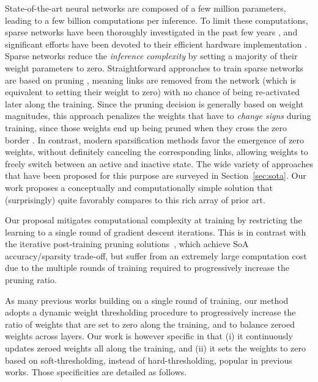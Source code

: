 \documentclass[10pt,twocolumn,letterpaper]{article}
\begin{document}
State-of-the-art neural networks are composed of a few million parameters, leading to a few billion computations per inference. To limit these computations, sparse networks have been thoroughly investigated in the past few years \cite{Zhu2018,Frankle2019,Liu2019,Zhou2019a,Lee2019,Wortsman2019,Evci2020,Frankle2020,Renda2020,Li2020,Zhou2021,Liu2021}, and significant efforts have been devoted to their efficient hardware implementation \cite{Gray2017,Mishra2021}. Sparse networks reduce the \emph{inference complexity} by setting a majority of their weight parameters to zero. Straightforward approaches to train sparse networks are based on pruning \cite{Zhu2018,Han2015,Frankle2019}, meaning links are removed from the network (which is equivalent to setting their weight to zero)  with no chance of being re-activated later along the training. 
Since the pruning decision is generally based on weight magnitudes, this approach penalizes the weights that have to \emph{change signs} during training, since those weights end up being pruned when they cross the zero border \cite{Sanh2020}. 
In contrast, modern sparsification methods favor the emergence of zero weights, without definitely canceling the corresponding links,
allowing weights to freely switch between an active and inactive state. 
The wide variety of approaches that have been proposed for this purpose are surveyed in Section~\ref{sec:sota}. Our work proposes a conceptually and computationally simple solution that (surprisingly) quite favorably compares to this rich array of prior art. 

Our proposal mitigates computational complexity at training by restricting the learning to a single round of gradient descent iterations. This is in contrast with the iterative post-training pruning solutions~\cite{Frankle2020,Renda2020}, which achieve SoA accuracy/sparsity trade-off, but suffer from an extremely large computation cost due to the multiple rounds of training required to progressively increase the pruning ratio.

As many previous works building on a single round of training, our method adopts a dynamic weight thresholding procedure to progressively increase the ratio of weights that are set to zero along the training, and to balance zeroed weights across layers. 
Our work is however specific in that (i) it continuously updates zeroed weights all along the training, and (ii) it sets the weights to zero based on soft-thresholding, instead of hard-thresholding, popular in previous works. Those specificities are detailed as follows. 
\end{document}
